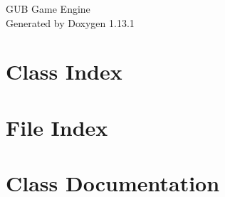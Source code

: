 \documentclass[twoside]{book}
\newcommand{\+}{\discretionary{\mbox{\scriptsize$\hookleftarrow$}}{}{}}
\newcommand{\clearemptydoublepage}{%
    \newpage{\pagestyle{empty}\cleardoublepage}%
  }
\begin{document}
  \raggedbottom
    \hypersetup{pageanchor=false,
                bookmarksnumbered=true,
                pdfencoding=unicode
               }
  \begin{titlepage}
  \vspace*{7cm}
  \begin{center}%
  {\Large GUB Game Engine}\\
  \vspace*{1cm}
  {\large Generated by Doxygen 1.13.1}\\
  \end{center}
  \end{titlepage}
  \clearemptydoublepage
  \tableofcontents
  \clearemptydoublepage
  \hypersetup{pageanchor=true}

\chapter{Class Index}

\chapter{File Index}

\chapter{Class Documentation}












































\end{document}
